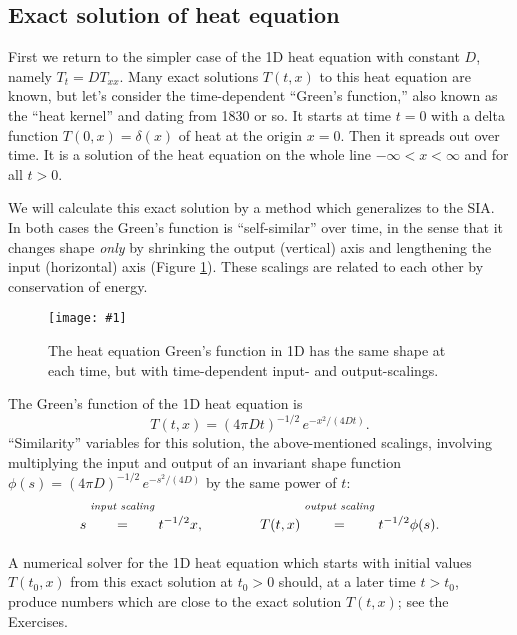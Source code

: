 \documentclass[letterpaper,final,12pt,reqno]{amsart}
\newcommand{\onefigsize}[3]{
\begin{figure}[ht]
\centering
\texttt{[image: \#1]}
\caption{#2}
\label{fig:#1}
\end{figure}}
\begin{document}
\subsection*{Exact solution of heat equation}  First we return to the simpler case of the 1D heat equation with constant $D$, namely $T_t = D T_{xx}$.  Many exact solutions $T(t,x)$ to this heat equation are known, but let's consider the time-dependent ``Green's function,'' also known as the ``heat kernel'' and dating from 1830 or so.  It starts at time $t=0$ with a delta function $T(0,x)=\delta(x)$ of heat at the origin $x=0$.  Then it spreads out over time.  It is a solution of the heat equation on the whole line $-\infty<x<\infty$ and for all $t>0$.

We will calculate this exact solution by a method which generalizes to the SIA.  In both cases the Green's function is ``self-similar'' over time, in the sense that it changes shape \emph{only} by shrinking the output (vertical) axis and lengthening the input (horizontal) axis (Figure \ref{fig:heatscaling}).  These scalings are related to each other by conservation of energy.

\onefigsize{heatscaling}{The heat equation Green's function in 1D has the same shape at each time, but with time-dependent input- and output-scalings.}{2.4in}

The Green's function of the 1D heat equation is
  $$T(t,x) = (4 \pi D t)^{-1/2}\, e^{-x^2/(4Dt)}.$$
``Similarity'' variables for this solution, the above-mentioned scalings, involving multiplying the input and output of an invariant shape function $\phi(s) = (4 \pi D)^{-1/2}\, e^{-s^2/(4D)}$ by the same power of $t$:
\begin{equation}
s \stackrel{\text{\emph{input scaling}}}{\phantom{\Big|}=\phantom{\Big|}} t^{-1/2} x, \qquad\qquad T(t,x) \stackrel{\text{\emph{output scaling}}}{\phantom{\Big|}=\phantom{\Big|}} t^{-1/2} \phi(s).  \label{heatscalings}
\end{equation}

A numerical solver for the 1D heat equation which starts with initial values $T(t_0,x)$ from this exact solution at $t_0>0$ should, at a later time $t>t_0$, produce numbers which are close to the exact solution $T(t,x)$; see the Exercises.
\end{document}
